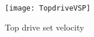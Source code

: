 \begin{figure}[!hbt]
  \centering
  \texttt{[image: TopdriveVSP]}
  \caption[Top drive set velocity]{Top drive set velocity}\label{figure_topdrive_VSP}
\end{figure}

%


